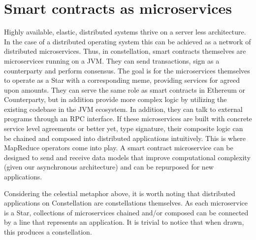 \documentclass{article}
\begin{document}
\section{Smart contracts as microservices}
Highly available, elastic, distributed systems thrive on a server less architecture. In the case of a distributed operating system this can be achieved as a network of distributed microservices. Thus, in constellation, smart contracts themselves are microservices running on a JVM. They can send transactions, sign as a counterparty and perform consensus. The goal is for the microservices themselves to operate as a Star with a corresponding meme, providing services for agreed upon amounts. They can serve the same role as smart contracts in Ethereum or Counterparty, but in addition provide more complex logic by utilizing the existing codebase in the JVM ecosystem. In addition, they can talk to external programs through an RPC interface. If these microservices are built with concrete service level agreements or better yet, type signature, their composite logic can be chained and composed into distributed applications intuitively. This is where MapReduce operators come into play. A smart contract microservice can be designed to send and receive data models that improve computational complexity (given our asynchronous architecture) and can be repurposed for new applications.

Considering the celestial metaphor above, it is worth noting that distributed applications on Constellation are constellations themselves. As each microservice is a  Star, collections of microservices chained and/or composed can be connected by a line that represents an application. It is trivial to notice that when drawn, this produces a constellation.
\end{document}
